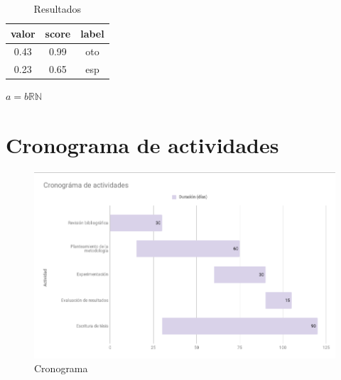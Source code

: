 \documentclass{article}
\begin{document}
\begin{table}[]
    \centering
    \begin{tabular}{|c|c|c|}
        \hline \bf valor & \bf score & \bf label \\
        \hline 0.43 & 0.99 & oto \\
        \hline 0.23 & 0.65 & esp \\
    \end{tabular}
    \caption{Resultados}
    \label{tab:tabla1}
\end{table}{}


$ a = b  \mathbb{RN} $

\section{Cronograma de actividades}
\begin{figure}
    \centering
    \includegraphics[width=\textwidth]{crono.png}
    \caption{Cronograma}
    \label{fig:cronograma}
\end{figure}{}


\end{document}
